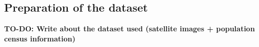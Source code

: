 \subsection{Preparation of the dataset}
\textbf{TO-DO: Write about the dataset used (satellite images + population census information)}